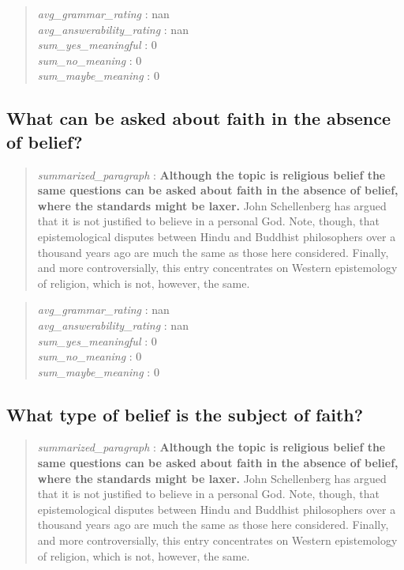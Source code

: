 \begin{quote}
\emph{avg\_grammar\_rating} : nan\\
\emph{avg\_answerability\_rating} : nan\\
\emph{sum\_yes\_meaningful} : 0\\
\emph{sum\_no\_meaning} : 0\\
\emph{sum\_maybe\_meaning} : 0
\end{quote}

\hypertarget{what-can-be-asked-about-faith-in-the-absence-of-belief}{%
\subsection{What can be asked about faith in the absence of
belief?}\label{what-can-be-asked-about-faith-in-the-absence-of-belief}}

\begin{quote}
\emph{summarized\_paragraph} : \textbf{Although the topic is religious
belief the same questions can be asked about faith in the absence of
belief, where the standards might be laxer.} John Schellenberg has
argued that it is not justified to believe in a personal God. Note,
though, that epistemological disputes between Hindu and Buddhist
philosophers over a thousand years ago are much the same as those here
considered. Finally, and more controversially, this entry concentrates
on Western epistemology of religion, which is not, however, the same.
\end{quote}

\begin{quote}
\emph{avg\_grammar\_rating} : nan\\
\emph{avg\_answerability\_rating} : nan\\
\emph{sum\_yes\_meaningful} : 0\\
\emph{sum\_no\_meaning} : 0\\
\emph{sum\_maybe\_meaning} : 0
\end{quote}

\hypertarget{what-type-of-belief-is-the-subject-of-faith}{%
\subsection{What type of belief is the subject of
faith?}\label{what-type-of-belief-is-the-subject-of-faith}}

\begin{quote}
\emph{summarized\_paragraph} : \textbf{Although the topic is religious
belief the same questions can be asked about faith in the absence of
belief, where the standards might be laxer.} John Schellenberg has
argued that it is not justified to believe in a personal God. Note,
though, that epistemological disputes between Hindu and Buddhist
philosophers over a thousand years ago are much the same as those here
considered. Finally, and more controversially, this entry concentrates
on Western epistemology of religion, which is not, however, the same.
\end{quote}

